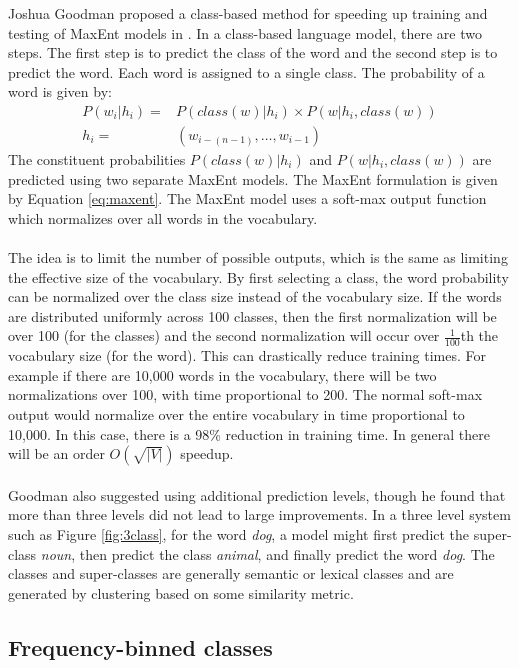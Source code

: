 Joshua Goodman proposed a class-based method for speeding up training and testing of MaxEnt models in \cite{Goodman2001}. In a class-based language model, there are two steps. The first step is to predict the class of the word and the second step is to predict the word. Each word is assigned to a single class. 
The probability of a word is given by:
\begin{align}
P(w_i | h_i)  =&  P(class(w) | h_i) \times P(w|  h_i, class(w))
\\ h_i =& ( w_{i-(n-1)},\dots, w_{i-1} ) \nonumber
\end{align}
The constituent probabilities $P(class(w) | h_i)$ and $P(w|  h_i, class(w))$ are predicted using two separate MaxEnt models. The MaxEnt formulation is given by Equation \ref{eq:maxent}. The MaxEnt model uses a soft-max output function which normalizes over all words in the vocabulary.
\paragraph{}
The idea is to limit the number of possible outputs, which is the same as limiting the effective size of the vocabulary. By first selecting a class, the word probability can be normalized over the class size instead of the vocabulary size. If the words are distributed uniformly across 100 classes, then the first normalization will be over 100 (for the classes) and the second normalization will occur over $\frac{1}{100}$th the vocabulary size (for the word). This can drastically reduce training times. For example if there are 10,000 words in the vocabulary, there will be two normalizations over 100, with time proportional to 200. The normal soft-max output would normalize over the entire vocabulary in time proportional to 10,000. In this case, there is a 98\% reduction in training time. In general there will be an order $O(\sqrt{|V|})$ speedup.
\paragraph{}
Goodman also suggested using additional prediction levels, though he found that more than three levels did not lead to large improvements. In a three level system such as Figure \ref{fig:3class}, for the word \emph{dog}, a model might first predict the super-class \emph{noun}, then predict the class \emph{animal}, and finally predict the word \emph{dog}. The classes and super-classes are generally semantic or lexical classes and are generated by clustering based on some similarity metric.
\subsection{Frequency-binned classes} \label{sec:frequencybinning}
